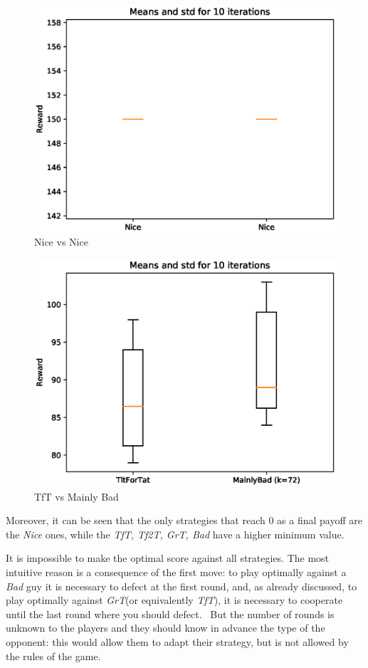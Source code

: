 \documentclass[journal,10pt,twoside]{IEEEtran}
\begin{document}
\begin{figure}[!ht]
    \centering
    \includegraphics[width=.8\columnwidth]{../img/ipd2p/ipd2p-boxplot-Nice-Nice}
    \caption{Nice vs Nice}
    \label{fig:boxnn}
\end{figure}

\begin{figure}[!ht]
    \centering
    \includegraphics[width=.8\columnwidth]{../img/ipd2p/ipd2p-boxplot-TitForTat-MainlyBad(k=72)}
    \caption{TfT vs Mainly Bad}
    \label{fig:boxmbvtft}
\end{figure}

Moreover, it can be seen that the only strategies that reach $0$ as a final payoff are the \textit{Nice} ones, while the \textit{TfT, Tf2T, GrT, Bad} have a higher minimum value.

It is impossible to make the optimal score against all strategies. The most intuitive reason is a consequence of the first move: to play optimally against a \textit{Bad} guy it is necessary to defect at the first round, and, as already discussed, to play optimally against \textit{GrT}(or equivalently \textit{TfT}), it is necessary to cooperate until the last round where you should defect.~\cite{mathieu2017}
But the number of rounds is unknown to the players and they should know in advance the type of the opponent: this would allow them to adapt their strategy, but is not allowed by the rules of the game. 
\end{document}
